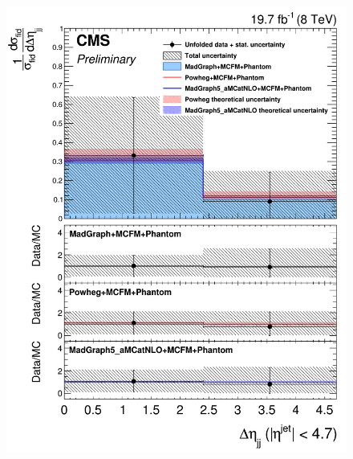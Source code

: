 \begin{figure}[hbtp]
  \begin{center}
    \includegraphics[width=\cmsFigWidth]{Figures/DiffCrossSecZZTo4mDeta_Unfolded_fr_MadGraph_norm.png}     

\end{center}
\end{figure}
